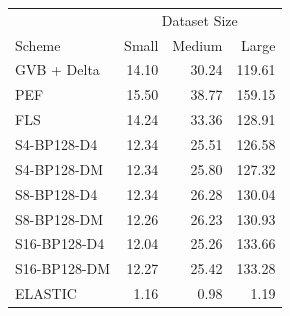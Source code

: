 \begin{tabular}{lrrr}
\toprule
 & \multicolumn{3}{c}{Dataset Size} \\
Scheme & Small & Medium & Large \\
\midrule
GVB + Delta & 14.10 & 30.24 & 119.61 \\
PEF & 15.50 & 38.77 & 159.15 \\
FLS & 14.24 & 33.36 & 128.91 \\
S4-BP128-D4 & 12.34 & 25.51 & 126.58 \\
S4-BP128-DM & 12.34 & 25.80 & 127.32 \\
S8-BP128-D4 & 12.34 & 26.28 & 130.04 \\
S8-BP128-DM & 12.26 & 26.23 & 130.93 \\
S16-BP128-D4 & 12.04 & 25.26 & 133.66 \\
S16-BP128-DM & 12.27 & 25.42 & 133.28 \\
ELASTIC & 1.16 & 0.98 & 1.19 \\
\bottomrule
\end{tabular}
